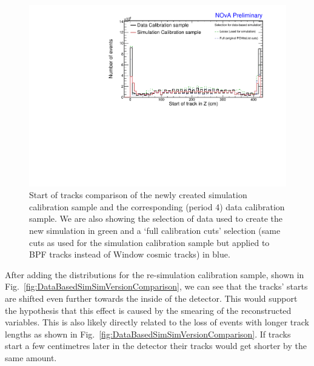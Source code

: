 \begin{figure}[!ht]
\includegraphics[clip, width=\textwidth]{Plots/TBCalibration/DBSim_DataMCComparison_StartZ.pdf}
\caption[Data-Simulation comparison of track start distribution]{Start of tracks comparison of the newly created simulation calibration sample and the corresponding (period 4) data calibration sample. We are also showing the selection of data used to create the new simulation in green and a `full calibration cuts' selection (same cuts as used for the simulation calibration sample but applied to \acrshort{BPF} tracks instead of Window cosmic tracks) in blue.}
\label{fig:DataBasedSimDataMCComparison_startZ}
\end{figure}

After adding the distributions for the re-simulation calibration sample, shown in Fig.~\ref{fig:DataBasedSimSimVersionComparison}, we can see that the tracks' starts are shifted even further towards the inside of the detector. This would support the hypothesis that this effect is caused by the smearing of the reconstructed variables. This is also likely directly related to the loss of events with longer track lengths as shown in Fig.~\ref{fig:DataBasedSimSimVersionComparison}. If tracks start a few centimetres later in the detector their tracks would get shorter by the same amount.

